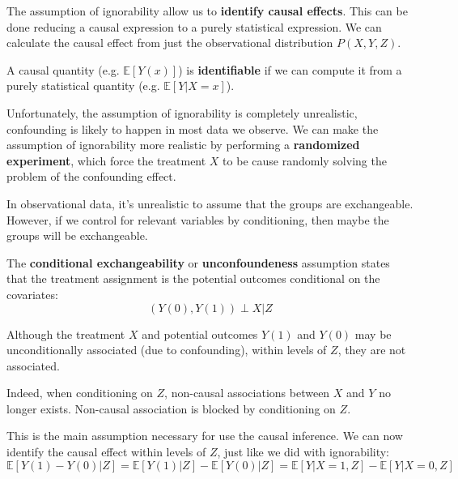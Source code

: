 The assumption of ignorability allow us to \textbf{identify causal effects}. This
can be done reducing a causal expression to a purely statistical expression. We
can calculate the causal effect from just the observational distribution $P(X, Y, Z)$.

\begin{definition}
    A causal quantity (e.g. $\mathbb{E}[Y(x)]$) is \textbf{identifiable} if we can
    compute it from a purely statistical quantity (e.g. $\mathbb{E}[Y| X = x]$).
\end{definition}

Unfortunately, the assumption of ignorability is completely unrealistic, confounding
is likely to happen in most data we observe. We can make the assumption of ignorability
more realistic by performing a \textbf{randomized experiment}, which force the
treatment $X$ to be cause randomly solving the problem of the confounding effect.

In observational data, it's unrealistic to assume that the groups are exchangeable.
However, if we control for relevant variables by conditioning, then maybe the groups
will be exchangeable.

\begin{definition}
    The \textbf{conditional exchangeability} or \textbf{unconfoundeness} assumption
    states that the treatment assignment is the potential outcomes conditional
    on the covariates:
    \begin{equation}
        (Y(0), Y(1)) \perp X | Z
    \end{equation}
\end{definition}

Although the treatment $X$ and potential outcomes $Y(1)$ and $Y(0)$ may be
unconditionally associated (due to confounding), within levels of $Z$, they are
not associated.

Indeed, when conditioning on $Z$, non-causal associations between $X$ and $Y$ no
longer exists. Non-causal association is blocked by conditioning on $Z$.

This is the main assumption necessary for use the causal inference. We can now identify
the causal effect within levels of $Z$, just like we did with ignorability:
\begin{equation}
    \mathbb{E}[Y(1) - Y(0) | Z] = \mathbb{E}[Y(1)| Z] - \mathbb{E}[Y(0)| Z] =
    \mathbb{E}[Y|X = 1, Z] - \mathbb{E}[Y|X = 0, Z]
\end{equation}

